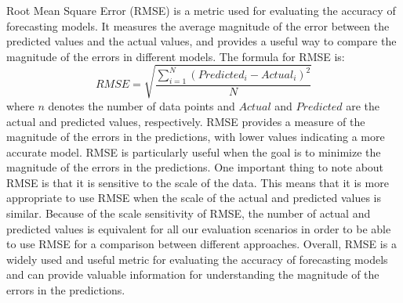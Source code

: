      Root Mean Square Error (RMSE) \cite{chaiRootMeanSquare2014} is a metric used for evaluating the accuracy of forecasting models. It measures the average magnitude of the error between the predicted values and the actual values, and provides a useful way to compare the magnitude of the errors in different models.
      The formula for RMSE is:
      $$RMSE = \sqrt{\frac{\sum_{i = 1}^{N}\left(Predicted_i - Actual_i\right)^2}{N}}$$
      where $n$ denotes the number of data points and $Actual$ and $Predicted$ are the actual and predicted values, respectively.
      RMSE provides a measure of the magnitude of the errors in the predictions, with lower values indicating a more accurate model. 
      RMSE is particularly useful when the goal is to minimize the magnitude of the errors in the predictions.
      One important thing to note about RMSE is that it is sensitive to the scale of the data. This means that it is more appropriate to use RMSE when the scale of the actual and predicted values is similar.
      Because of the scale sensitivity of RMSE, the number of actual and predicted values is equivalent for all our evaluation scenarios in order to be able to use RMSE for a comparison between different approaches.
      Overall, RMSE is a widely used and useful metric for evaluating the accuracy of forecasting models and can provide valuable information for understanding the magnitude of the errors in the predictions.







